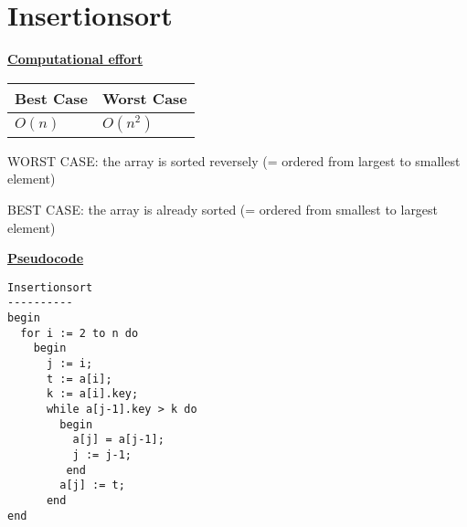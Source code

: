 \documentclass[a4paper]{report}
\begin{document}
\chapter*{Insertionsort}

\underline{\bf{Computational effort}}

\begin{tabular}{|l|l|}
\hline
Best Case & Worst Case \\ \hline
$O(n) $     & $O(n^2)$ \\ \hline
\end{tabular}

WORST CASE: the array is sorted reversely (= ordered from largest to smallest element)



BEST CASE: the array is already sorted (= ordered from smallest to largest element)

\underline{\bf{Pseudocode}}

\begin{lstlisting}
Insertionsort
----------
begin 
  for i := 2 to n do
    begin
      j := i;
      t := a[i];
      k := a[i].key;
      while a[j-1].key > k do
        begin
          a[j] = a[j-1];
          j := j-1;
         end
        a[j] := t;
      end
end
\end{lstlisting}
\end{document}
